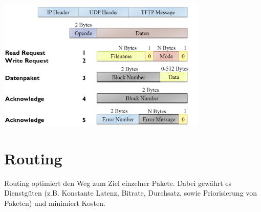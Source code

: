\documentclass{article} %
\begin{document}
	\begin{center}
		\includegraphics[width=10cm]{img/tftp.png}
	\end{center}
	
	

\section{Routing}

Routing optimiert den Weg zum Ziel einzelner Pakete.
Dabei gewährt es Dienstgüten (z.B. Konstante Latenz, Bitrate, Durchsatz, sowie Priorisierung von Paketen) und minimiert Kosten.
\end{document}
